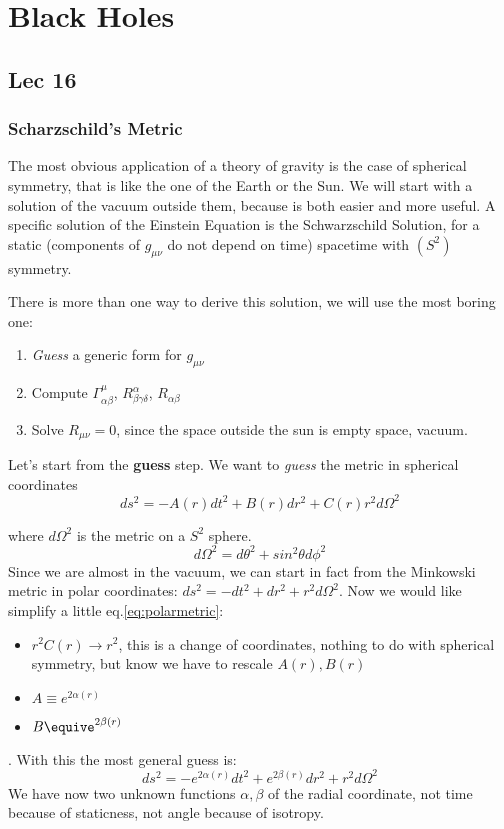 \chapter{Black Holes}
\section{Lec 16}
\subsection{Scharzschild's Metric}
The most obvious application of a theory of gravity is the case of spherical symmetry, that is like the one of the Earth or the Sun. We will start with a solution of the vacuum outside them, because is both easier and more useful. 
A specific solution of the Einstein Equation is the Schwarzschild Solution, for a static (components of $g_{\mu \nu }$ do not depend on time) spacetime with $\left( S^{2} \right)$ symmetry.\par
There is more than one way to derive this solution, we will use the most boring one:
\begin{enumerate}
\item \emph{Guess} a generic form for $g_{\mu \nu } $
\item Compute $\Gamma ^{\mu }_{\alpha \beta }$, $R^{\alpha }_{\beta \gamma \delta }$, $R_{\alpha \beta }$
\item Solve $R_{\mu \nu } = 0$, since the space outside the sun is empty space, vacuum.
\end{enumerate}

Let's start from the \textbf{guess} step.
We want to \emph{guess} the metric in spherical coordinates 
\begin{equation}\label{eq:polarmetric}
ds^{2}= -A\left( r \right) dt^{2} + B\left( r \right) dr^{2} + C\left( r \right) r^{2}d\Omega ^{2}
\end{equation}

where $d\Omega ^{2}$ is the metric on a $S^{2}$ sphere.
\[
	d\Omega ^{2} = d\theta ^{2} + sin^{2}\theta d\phi ^{2}
\]
Since we are almost in the vacuum, we can start in fact from the Minkowski metric in polar coordinates: $ds^{2 }=-dt^{2} +dr^{2}+r^{2}d\Omega ^{2} $.
Now we would like simplify a little eq.\ref{eq:polarmetric}:
\begin{itemize}
\item $r^{2}C\left( r \right) \to  r^{2}$, this is a change of coordinates, nothing to do with spherical symmetry, but know we have to rescale $A\left( r \right), B\left( r \right)$
\item $A \equiv e^{2\alpha \left( r \right)}$
\item $B\equive^{2\beta \left( r \right)}$
\end{itemize}.
With this the most general guess is:
\begin{equation}\label{eq:pmetric2}
ds^{2} = -e^{2\alpha \left( r \right)}dt^{2} + e^{2\beta \left( r \right)}dr^{2} + r^{2}d\Omega ^{2}
\end{equation}
We have now two unknown functions $\alpha ,\beta $ of the radial coordinate, not time because of staticness, not angle because of isotropy.
	

